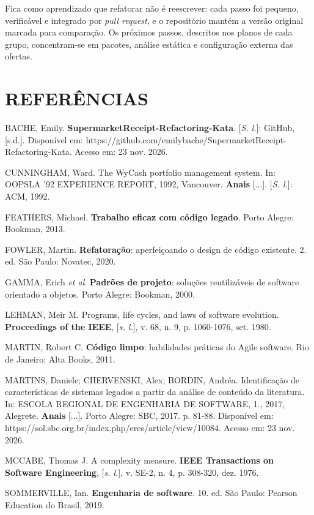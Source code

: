 \documentclass[12pt,a4paper]{article}
\begin{document}
Fica como aprendizado que refatorar não é reescrever: cada passo foi pequeno, verificável e integrado por \textit{pull request}, e o repositório mantém a versão original marcada para comparação. Os próximos passos, descritos nos planos de cada grupo, concentram-se em pacotes, análise estática e configuração externa das ofertas.

\newpage
\section*{REFERÊNCIAS}
\begin{singlespace}\raggedright\noindent
BACHE, Emily. \textbf{SupermarketReceipt-Refactoring-Kata}. [\textit{S. l.}]: GitHub, [s.d.]. Disponível em: https://github.com/emilybache/SupermarketReceipt-Refactoring-Kata. Acesso em: 23 nov. 2026.

\vspace{12pt}\noindent CUNNINGHAM, Ward. The WyCash portfolio management system. In: OOPSLA '92 EXPERIENCE REPORT, 1992, Vancouver. \textbf{Anais} [...]. [\textit{S. l.}]: ACM, 1992.

\vspace{12pt}\noindent FEATHERS, Michael. \textbf{Trabalho eficaz com código legado}. Porto Alegre: Bookman, 2013.

\vspace{12pt}\noindent FOWLER, Martin. \textbf{Refatoração}: aperfeiçoando o design de código existente. 2. ed. São Paulo: Novatec, 2020.

\vspace{12pt}\noindent GAMMA, Erich \textit{et al}. \textbf{Padrões de projeto}: soluções reutilizáveis de software orientado a objetos. Porto Alegre: Bookman, 2000.

\vspace{12pt}\noindent LEHMAN, Meir M. Programs, life cycles, and laws of software evolution. \textbf{Proceedings of the IEEE}, [\textit{s. l.}], v. 68, n. 9, p. 1060-1076, set. 1980.

\vspace{12pt}\noindent MARTIN, Robert C. \textbf{Código limpo}: habilidades práticas do Agile software. Rio de Janeiro: Alta Books, 2011.

\vspace{12pt}\noindent MARTINS, Daniele; CHERVENSKI, Alex; BORDIN, Andréa. Identificação de características de sistemas legados a partir da análise de conteúdo da literatura. In: ESCOLA REGIONAL DE ENGENHARIA DE SOFTWARE, 1., 2017, Alegrete. \textbf{Anais} [...]. Porto Alegre: SBC, 2017. p. 81-88. Disponível em: https://sol.sbc.org.br/index.php/eres/article/view/10084. Acesso em: 23 nov. 2026.

\vspace{12pt}\noindent MCCABE, Thomas J. A complexity measure. \textbf{IEEE Transactions on Software Engineering}, [\textit{s. l.}], v. SE-2, n. 4, p. 308-320, dez. 1976.

\vspace{12pt}\noindent SOMMERVILLE, Ian. \textbf{Engenharia de software}. 10. ed. São Paulo: Pearson Education do Brasil, 2019.
\end{singlespace}
\end{document}
